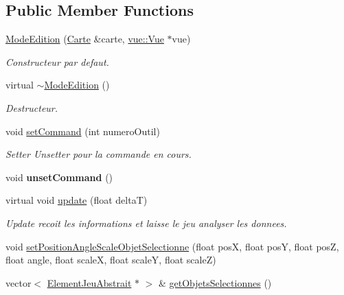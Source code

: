 \subsection*{Public Member Functions}
\begin{DoxyCompactItemize}
\item 
\hypertarget{group__inf2990_ga0aa05c104a50d0e25c6e7f82fbb142ff}{\hyperlink{group__inf2990_ga0aa05c104a50d0e25c6e7f82fbb142ff}{Mode\-Edition} (\hyperlink{class_carte}{Carte} \&carte, \hyperlink{classvue_1_1_vue}{vue\-::\-Vue} $\ast$vue)}\label{group__inf2990_ga0aa05c104a50d0e25c6e7f82fbb142ff}

\begin{DoxyCompactList}\small\item\em Constructeur par defaut. \end{DoxyCompactList}\item 
\hypertarget{group__inf2990_gae3468af0e1eea13d063a084401c34a05}{virtual \hyperlink{group__inf2990_gae3468af0e1eea13d063a084401c34a05}{$\sim$\-Mode\-Edition} ()}\label{group__inf2990_gae3468af0e1eea13d063a084401c34a05}

\begin{DoxyCompactList}\small\item\em Destructeur. \end{DoxyCompactList}\item 
\hypertarget{group__inf2990_gac35939dea30e8f7de122a30e7d38d9a0}{void \hyperlink{group__inf2990_gac35939dea30e8f7de122a30e7d38d9a0}{set\-Command} (int numero\-Outil)}\label{group__inf2990_gac35939dea30e8f7de122a30e7d38d9a0}

\begin{DoxyCompactList}\small\item\em Setter Unsetter pour la commande en cours. \end{DoxyCompactList}\item 
\hypertarget{group__inf2990_ga6afae356465e03636187c5e62190c501}{void {\bfseries unset\-Command} ()}\label{group__inf2990_ga6afae356465e03636187c5e62190c501}

\item 
\hypertarget{group__inf2990_ga39858d3c94a25354f54068c3b32cab2a}{virtual void \hyperlink{group__inf2990_ga39858d3c94a25354f54068c3b32cab2a}{update} (float delta\-T)}\label{group__inf2990_ga39858d3c94a25354f54068c3b32cab2a}

\begin{DoxyCompactList}\small\item\em Update recoit les informations et laisse le jeu analyser les donnees. \end{DoxyCompactList}\item 
void \hyperlink{group__inf2990_ga47db3339cda33fdc249548620e0dcc8f}{set\-Position\-Angle\-Scale\-Objet\-Selectionne} (float pos\-X, float pos\-Y, float pos\-Z, float angle, float scale\-X, float scale\-Y, float scale\-Z)
\item 
vector$<$ \hyperlink{class_element_jeu_abstrait}{Element\-Jeu\-Abstrait} $\ast$ $>$ \& \hyperlink{group__inf2990_ga75b06b061177f481474fd9d0a9892f94}{get\-Objets\-Selectionnes} ()
\end{DoxyCompactItemize}
